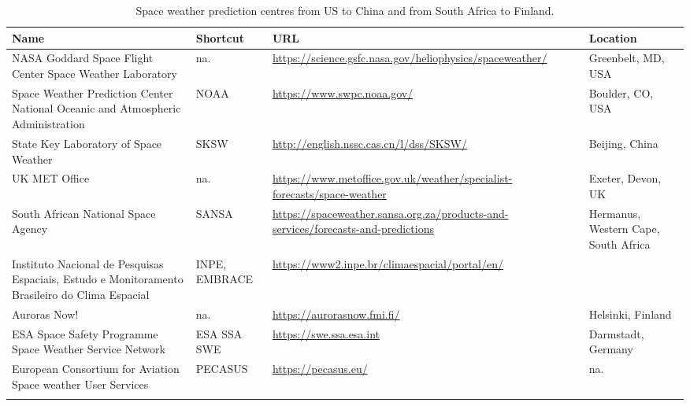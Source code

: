 \documentclass[sn-aps]{sn-jnl}%
\begin{document}
\pagebreak

\begin{table}[h]
\centering
\begin{tabular}[c]{p{3cm}p{1.2cm}p{3.25cm}p{1.75cm}}
Name & Shortcut & URL & Location \\                    
\hline
\hline 
NASA Goddard Space Flight Center Space Weather Laboratory & na. & \url{https://science.gsfc.nasa.gov/heliophysics/spaceweather/} & Greenbelt, MD, USA \\
\hline
Space Weather Prediction Center National Oceanic and Atmospheric Administration & NOAA & \url{https://www.swpc.noaa.gov/} & Boulder, CO, USA\\
\hline
State Key Laboratory of Space Weather & SKSW & \url{http://english.nssc.cas.cn/l/dss/SKSW/} & Beijing, China\\
\hline
UK MET Office & na. & \url{https://www.metoffice.gov.uk/weather/specialist-forecasts/space-weather} & Exeter, Devon, UK\\
\hline
  South African National Space Agency & SANSA & \url{https://spaceweather.sansa.org.za/products-and-services/forecasts-and-predictions} & Hermanus, Western Cape, South Africa \\
\hline
Instituto Nacional de Pesquisas Espaciais, Estudo e Monitoramento Brasileiro do Clima Espacial & INPE, EMBRACE & \url{https://www2.inpe.br/climaespacial/portal/en/} & \\  
\hline  
Auroras Now! & na. & \url{https://aurorasnow.fmi.fi/} & Helsinki, Finland\\
\hline 
ESA Space Safety Programme Space Weather Service Network & ESA SSA SWE & \url{https://swe.ssa.esa.int} & Darmstadt, Germany\\
\hline
European Consortium for Aviation Space weather User Services & PECASUS & \url{https://pecasus.eu/} & na.\\ \\
\end{tabular}
\caption[Forecast organisations. ]{Space weather prediction centres from US to China and from South Africa to Finland.}
\label{tab:agencies}
\end{table}



\pagebreak
\end{document}
